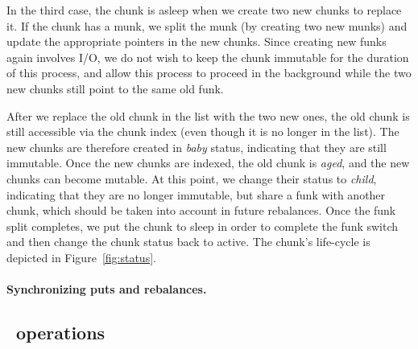 In the third case, the chunk is asleep when we create two new chunks to replace it. 
If the chunk has a munk, we split the munk (by creating two new munks) and update the appropriate pointers in the new chunks.  
Since creating new funks again involves I/O, we do not wish to keep the chunk immutable for the duration of this process,
and allow this process to proceed in the background while the two new chunks still point to the same old funk. 

After we replace the old chunk in the list with the two new ones, 
the old chunk is still accessible via the chunk index (even though it is no longer in the list). 
The new chunks are therefore created in \emph{baby} status, indicating that they are still immutable. 
Once the new chunks are indexed, the old chunk is \emph{aged}, and the new chunks can become mutable.
At this point, we change their status to \emph{child}, indicating that they are no longer immutable, but share a funk with another chunk,
which should be taken into account in future rebalances. Once the funk split completes, we put the chunk to sleep in order
to complete the funk switch and then change the chunk status  back to active. 
The chunk's life-cycle is depicted in Figure~\ref{fig:status}.



\paragraph{Synchronizing puts and rebalances.}


\subsection{\sys\ operations}
\label{ssec:ops}










